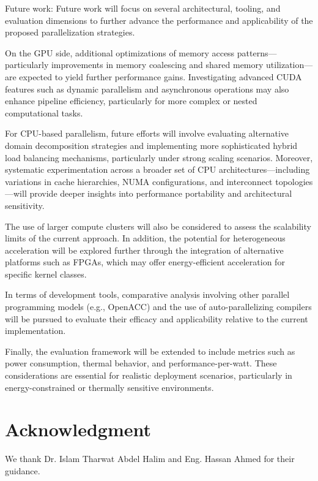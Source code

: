 \documentclass[conference, 10pt]{IEEEtran}
\begin{document}
Future work:
Future work will focus on several architectural, tooling, and evaluation dimensions to further advance the performance and applicability of the proposed parallelization strategies.

On the GPU side, additional optimizations of memory access patterns—particularly improvements in memory coalescing and shared memory utilization—are expected to yield further performance gains. Investigating advanced CUDA features such as dynamic parallelism and asynchronous operations may also enhance pipeline efficiency, particularly for more complex or nested computational tasks.

For CPU-based parallelism, future efforts will involve evaluating alternative domain decomposition strategies and implementing more sophisticated hybrid load balancing mechanisms, particularly under strong scaling scenarios. Moreover, systematic experimentation across a broader set of CPU architectures—including variations in cache hierarchies, NUMA configurations, and interconnect topologies—will provide deeper insights into performance portability and architectural sensitivity.

The use of larger compute clusters will also be considered to assess the scalability limits of the current approach. In addition, the potential for heterogeneous acceleration will be explored further through the integration of alternative platforms such as FPGAs, which may offer energy-efficient acceleration for specific kernel classes.

In terms of development tools, comparative analysis involving other parallel programming models (e.g., OpenACC) and the use of auto-parallelizing compilers will be pursued to evaluate their efficacy and applicability relative to the current implementation.

Finally, the evaluation framework will be extended to include metrics such as power consumption, thermal behavior, and performance-per-watt. These considerations are essential for realistic deployment scenarios, particularly in energy-constrained or thermally sensitive environments.





\section*{Acknowledgment} 
We thank Dr. Islam Tharwat Abdel Halim and Eng. Hassan Ahmed for their guidance.


 
\end{document}
